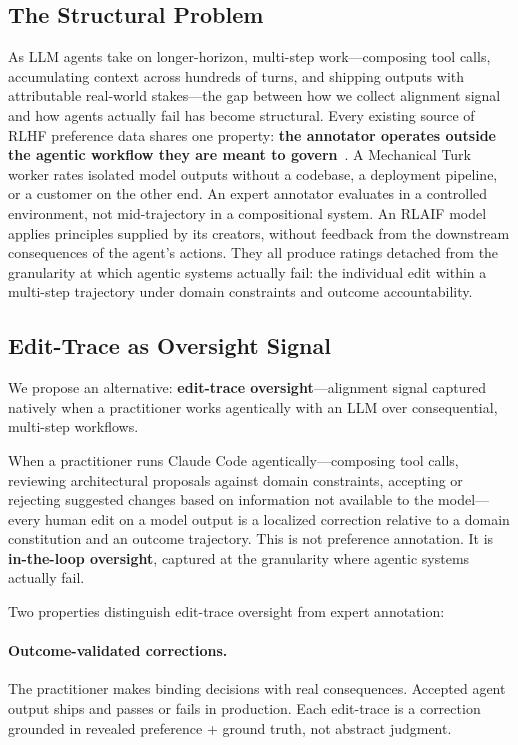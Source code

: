 \documentclass[11pt]{article}
\begin{document}
\subsection{The Structural Problem}
\label{sec:structural-problem}

As LLM agents take on longer-horizon, multi-step work---composing tool calls, accumulating context across hundreds of turns, and shipping outputs with attributable real-world stakes---the gap between how we collect alignment signal and how agents actually fail has become structural.
Every existing source of RLHF preference data shares one property: \textbf{the annotator operates outside the agentic workflow they are meant to govern}~\citep{stiennon2020learning, ouyang2022training, bai2022training}.
A Mechanical Turk worker rates isolated model outputs without a codebase, a deployment pipeline, or a customer on the other end.
An expert annotator evaluates in a controlled environment, not mid-trajectory in a compositional system.
An RLAIF model~\citep{lee2023rlaif} applies principles supplied by its creators, without feedback from the downstream consequences of the agent's actions.
They all produce ratings detached from the granularity at which agentic systems actually fail: the individual edit within a multi-step trajectory under domain constraints and outcome accountability.

\subsection{Edit-Trace as Oversight Signal}
\label{sec:edit-trace-signal}

We propose an alternative: \textbf{edit-trace oversight}---alignment signal captured natively when a practitioner works agentically with an LLM over consequential, multi-step workflows.

When a practitioner runs Claude Code agentically---composing tool calls, reviewing architectural proposals against domain constraints, accepting or rejecting suggested changes based on information not available to the model---every human edit on a model output is a localized correction relative to a domain constitution and an outcome trajectory.
This is not preference annotation.
It is \textbf{in-the-loop oversight}, captured at the granularity where agentic systems actually fail.

Two properties distinguish edit-trace oversight from expert annotation:

\paragraph{Outcome-validated corrections.}
The practitioner makes binding decisions with real consequences.
Accepted agent output ships and passes or fails in production.
Each edit-trace is a correction grounded in revealed preference + ground truth, not abstract judgment.
\end{document}
